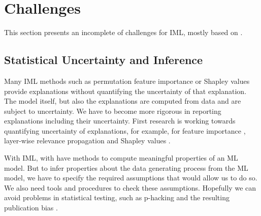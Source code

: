 \documentclass[runningheads]{llncs}
\begin{document}
%
\section{Challenges}

This section presents an incomplete of challenges for IML, mostly based on \cite{molnar2020pitfalls}.

\subsection{Statistical Uncertainty and Inference}

Many IML methods such as permutation feature importance or Shapley values provide explanations without quantifying the uncertainty of that explanation.
The model itself, but also the explanations are computed from data and are subject to uncertainty.
We have to become more rigorous in reporting explanations including their uncertainty.
First research is working towards quantifying uncertainty of explanations, for example, for feature importance \cite{watson2019testing,fisher2019all}, layer-wise relevance propagation \cite{fabi2020feature} and Shapley values \cite{williamson2020efficient}.

With IML, with have methods to compute meaningful properties of an ML model. 
But to infer properties about the data generating process from the ML model, we have to specify the required assumptions that would allow us to do so.
We also need tools and procedures to check these assumptions.
Hopefully we can avoid problems in statistical testing, such as p-hacking \cite{head2015extent} and the resulting publication bias \cite{begg1994publication}.
\end{document}
